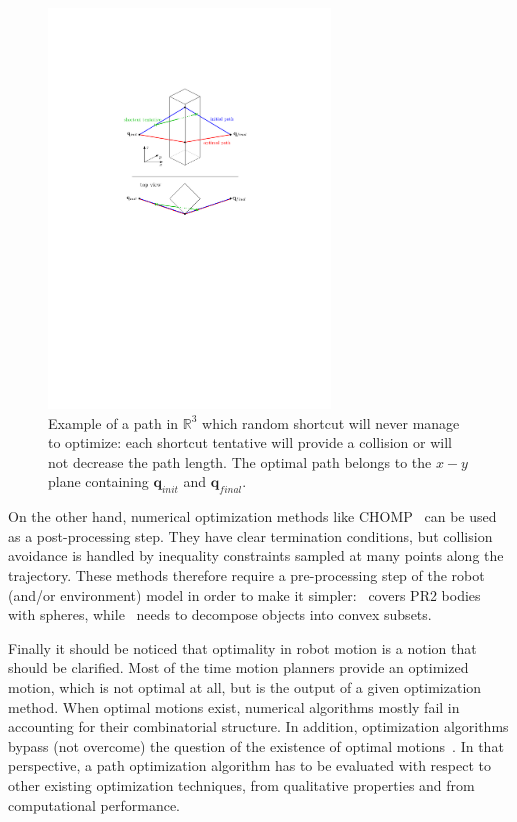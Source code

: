 \documentclass{tADR2e}
\newcommand\real{\mathbb{R}}
\newcommand\conf{\mathbf{q}}
\begin{document}
\begin{figure}
	\centering
	\includegraphics[width=7.5cm]{decoupled_DOF_optimization.pdf}
	\caption{Example of a path in $\real^3$ which random shortcut will never manage to 
	optimize: each shortcut tentative will provide a collision or will not 
	decrease the path length. The optimal path belongs to the $x-y$ plane 
	containing $\conf_{init}$ and $\conf_{final}$.}
	\label{decoupled_DOF_optimization}
\end{figure}

On the other hand, numerical
optimization methods like CHOMP~\cite{chompIjrr} can be used as a
post-processing step. They have clear termination conditions, but collision
avoidance is handled by inequality constraints sampled at many points along
the trajectory. These methods therefore require a pre-processing step of the
robot (and/or environment) model in order to make 
it simpler:~\cite{chompIjrr} covers PR2 bodies with spheres, 
while~\cite{convexOptimMotplan} needs to decompose objects into convex subsets.

Finally it should be noticed that optimality in robot motion is a notion that should be clarified. Most of the time motion planners provide an optimized motion, which is not optimal at all, but is the output of a given optimization method. When optimal motions exist, numerical
algorithms mostly fail in accounting for their combinatorial structure. In addition, optimization algorithms bypass (not overcome) the question of the existence of optimal motions~\cite{LaumondOptim}. In that perspective, a path optimization algorithm has to be evaluated with respect to other existing optimization techniques, from qualitative properties and from computational performance.
\end{document}
